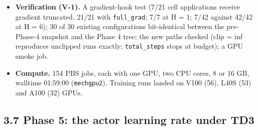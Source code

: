 \documentclass[11pt]{article}
\begin{document}
\begin{itemize}
\item \textbf{Verification (V-1).} A gradient-hook test (7/21 cell applications receive gradient truncated, 21/21 with \texttt{full\_grad}; 7/7 at H = 1; 7/42 against 42/42 at H = 6); 30 of 30 existing configurations bit-identical between the pre-Phase-4 snapshot and the Phase 4 tree; the new paths checked (clip = inf reproduces unclipped runs exactly; \texttt{total\_steps} stops at budget); a GPU smoke job.
\item \textbf{Compute.} 154 PBS jobs, each with one GPU, two CPU cores, 8 or 16 GB, walltime 01:59:00 (\texttt{mechgpu2}). Training runs landed on V100 (56), L40S (53) and A100 (32) GPUs.
\end{itemize}



\subsection*{3.7 Phase 5: the actor learning rate under TD3}
\end{document}

